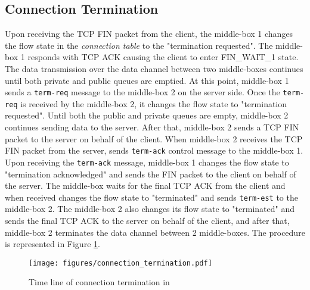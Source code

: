 \subsection{Connection Termination}
Upon receiving the TCP FIN packet from the client, the middle-box 1 changes the flow state in the \textit{connection table} to the "termination requested".
The middle-box 1 responds with TCP ACK causing the client to enter FIN\_WAIT\_1 state. 
The data transmission over the data channel between two middle-boxes continues until both private and public queues are emptied.
At this point, middle-box 1 sends a \texttt{term-req} message to the middle-box 2 on the server side.
Once the \texttt{term-req} is received by the middle-box 2, it changes the flow state to "termination requested".
Until both the public and private queues are empty, middle-box 2 continues sending data to the server.
After that, middle-box 2 sends a TCP FIN packet to the server on behalf of the client. 
When middle-box 2 receives the TCP FIN packet from the server, sends \texttt{term-ack} control message to the middle-box 1.
Upon receiving the \texttt{term-ack} message, middle-box 1 changes the flow state to "termination acknowledged" and sends the FIN packet to the client on behalf of the server.
The middle-box waits for the final TCP ACK from the client and when received changes the flow state to "terminated" and sends \texttt{term-est} to the middle-box 2.
The middle-box 2 also changes its flow state to "terminated" and sends the final TCP ACK to the server on behalf of the client, and after that, middle-box 2 terminates the data channel between 2 middle-boxes.
The procedure is represented in Figure \ref{fig:termination}.
\begin{figure}[!htbp]
    \centering
    \texttt{[image: figures/connection\_termination.pdf]}
    \caption{Time line of connection termination in {\sys}}
    \label{fig:termination}
\end{figure}













